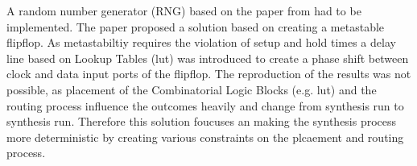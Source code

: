 A random number generator (RNG) based on the paper from \autocite{Majzoobi2011}
had to be implemented. The paper proposed a solution based on creating a metastable
flipflop. As metastabiltiy requires the violation of setup and hold times a
delay line based on Lookup Tables (\gls{lut}) was introduced to create a phase shift between
clock and data input ports of the flipflop. 
The reproduction of the results was not possible, as placement of the
Combinatorial Logic Blocks (e.g. \gls{lut}) and the routing process influence
the outcomes heavily and change from synthesis run to synthesis run. Therefore
this solution foucuses an making the synthesis process more deterministic
by creating various constraints on the plcaement and routing process.
